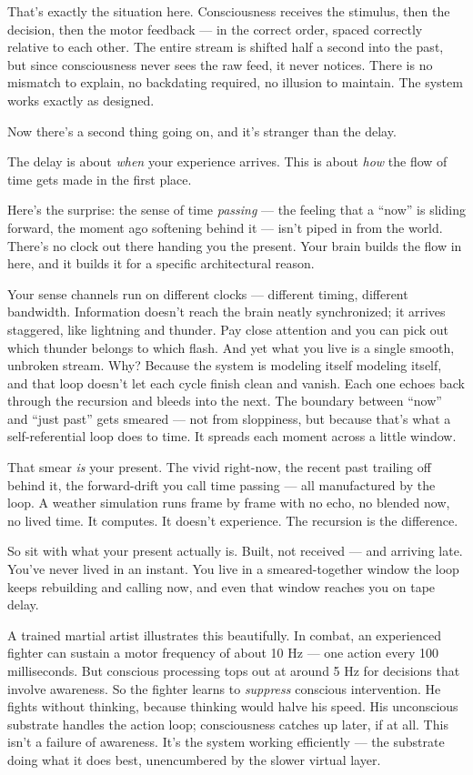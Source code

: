 \documentclass[11pt, twoside, openright]{book}
\begin{document}
That's exactly the situation here. Consciousness receives the stimulus, then the decision, then the motor feedback --- in the correct order, spaced correctly relative to each other. The entire stream is shifted half a second into the past, but since consciousness never sees the raw feed, it never notices. There is no mismatch to explain, no backdating required, no illusion to maintain. The system works exactly as designed.

Now there's a second thing going on, and it's stranger than the delay.

The delay is about \textit{when} your experience arrives. This is about \textit{how} the flow of time gets made in the first place.

Here's the surprise: the sense of time \textit{passing} --- the feeling that a ``now'' is sliding forward, the moment ago softening behind it --- isn't piped in from the world. There's no clock out there handing you the present. Your brain builds the flow in here, and it builds it for a specific architectural reason.

Your sense channels run on different clocks --- different timing, different bandwidth. Information doesn't reach the brain neatly synchronized; it arrives staggered, like lightning and thunder. Pay close attention and you can pick out which thunder belongs to which flash. And yet what you live is a single smooth, unbroken stream. Why? Because the system is modeling itself modeling itself, and that loop doesn't let each cycle finish clean and vanish. Each one echoes back through the recursion and bleeds into the next. The boundary between ``now'' and ``just past'' gets smeared --- not from sloppiness, but because that's what a self-referential loop does to time. It spreads each moment across a little window.

That smear \textit{is} your present. The vivid right-now, the recent past trailing off behind it, the forward-drift you call time passing --- all manufactured by the loop. A weather simulation runs frame by frame with no echo, no blended now, no lived time. It computes. It doesn't experience. The recursion is the difference.

So sit with what your present actually is. Built, not received --- and arriving late. You've never lived in an instant. You live in a smeared-together window the loop keeps rebuilding and calling now, and even that window reaches you on tape delay.

A trained martial artist illustrates this beautifully. In combat, an experienced fighter can sustain a motor frequency of about 10 Hz --- one action every 100 milliseconds. But conscious processing tops out at around 5 Hz for decisions that involve awareness. So the fighter learns to \textit{suppress} conscious intervention. He fights without thinking, because thinking would halve his speed. His unconscious substrate handles the action loop; consciousness catches up later, if at all. This isn't a failure of awareness. It's the system working efficiently --- the substrate doing what it does best, unencumbered by the slower virtual layer.
\end{document}
